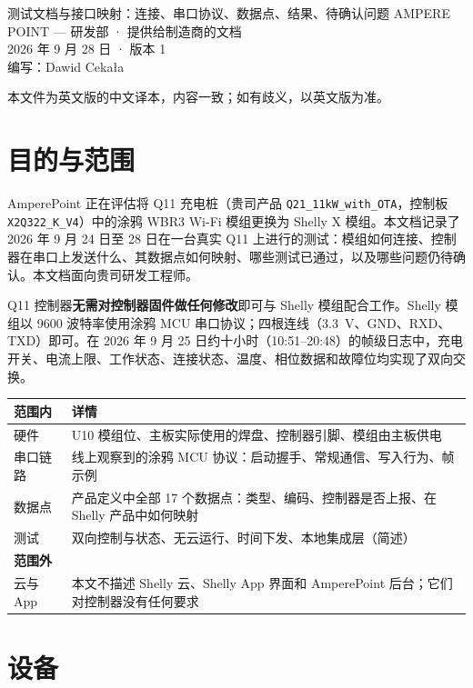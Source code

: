 \documentclass[11pt,a4paper]{article}
\begin{document}
%
{测试文档与接口映射：连接、串口协议、数据点、结果、待确认问题}%
{AMPERE POINT — 研发部 · 提供给制造商的文档\\2026 年 9 月 28 日 · 版本 1\\编写：Dawid Cekała}

{\small\color{apmuted}本文件为英文版的中文译本，内容一致；如有歧义，以英文版为准。}

\section{目的与范围}

AmperePoint 正在评估将 Q11 充电桩（贵司产品 \texttt{Q21\_11kW\_with\_OTA}，控制板 \texttt{X2Q322\_K\_V4}）中的涂鸦 WBR3 Wi-Fi 模组更换为 Shelly X 模组。本文档记录了 2026 年 9 月 24 日至 28 日在一台真实 Q11 上进行的测试：模组如何连接、控制器在串口上发送什么、其数据点如何映射、哪些测试已通过，以及哪些问题仍待确认。本文档面向贵司研发工程师。

\begin{apgreenb}[一句话结论]
Q11 控制器\textbf{无需对控制器固件做任何修改}即可与 Shelly 模组配合工作。Shelly 模组以 9600 波特率使用涂鸦 MCU 串口协议；四根连线（3.3~V、GND、RXD、TXD）即可。在 2026 年 9 月 25 日约十小时（10:51--20:48）的帧级日志中，充电开关、电流上限、工作状态、连接状态、温度、相位数据和故障位均实现了双向交换。
\end{apgreenb}

\begin{longtable}{>{\raggedright\arraybackslash}p{3.2cm}>{\raggedright\arraybackslash}p{12.9cm}}
\toprule
\rowcolor{aphead}\textbf{范围内} & \textbf{详情} \\
\midrule\endhead
\bottomrule\endfoot
硬件 & U10 模组位、主板实际使用的焊盘、控制器引脚、模组由主板供电 \\
串口链路 & 线上观察到的涂鸦 MCU 协议：启动握手、常规通信、写入行为、帧示例 \\
数据点 & 产品定义中全部 17 个数据点：类型、编码、控制器是否上报、在 Shelly 产品中如何映射 \\
测试 & 双向控制与状态、无云运行、时间下发、本地集成层（简述） \\
\rowcolor{aphead}\textbf{范围外} & \\
云与 App & 本文不描述 Shelly 云、Shelly App 界面和 AmperePoint 后台；它们对控制器没有任何要求 \\
\end{longtable}

\section{设备}
\end{document}
